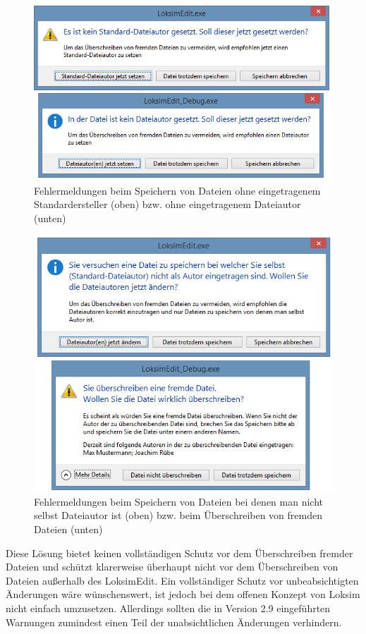 \begin{figure}
\centering
\includegraphics[width=1.0\textwidth]{editor/images/datei_ueberschreiben_empty.png}
\caption{Fehlermeldungen beim Speichern von Dateien ohne eingetragenem Standardersteller (oben) bzw. ohne eingetragenem Dateiautor (unten)}
\label{fig:editor-datei-ueberschreiben-empty}
\end{figure}

\begin{figure}
\centering
\includegraphics[width=1.0\textwidth]{editor/images/datei_ueberschreiben_overwrite.png}
\caption{Fehlermeldungen beim Speichern von Dateien bei denen man nicht selbst Dateiautor ist (oben) bzw. beim Überschreiben von fremden Dateien (unten)}
\label{fig:editor-datei-ueberschreiben-overwrite}
\end{figure}

Diese Lösung bietet keinen vollständigen Schutz vor dem Überschreiben fremder Dateien und schützt klarerweise überhaupt nicht vor dem Überschreiben von Dateien außerhalb des LoksimEdit. Ein vollständiger Schutz vor unbeabsichtigten Änderungen wäre wünschenswert, ist jedoch bei dem offenen Konzept von Loksim nicht einfach umzusetzen. Allerdings sollten die in Version 2.9 eingeführten Warnungen zumindest einen Teil der unabsichtlichen Änderungen verhindern.